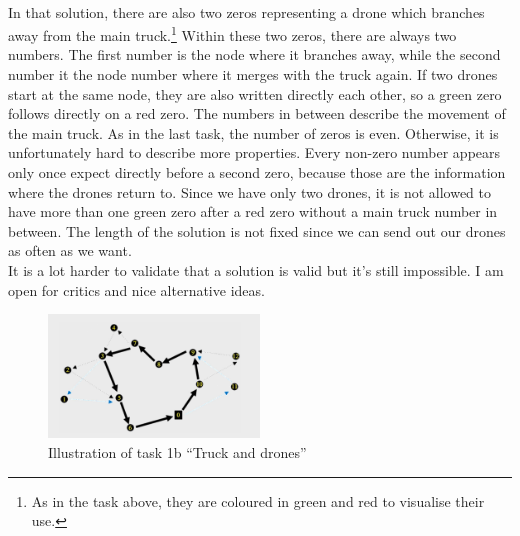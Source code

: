 \documentclass[a4paper,10pt]{article}
\theoremstyle{mytheor}
\begin{document}
\\
In that solution, there are also two zeros representing a drone which branches away from the main truck.\footnote{As in the task above, they are coloured in green and red to visualise their use.} Within these two zeros, there are always two numbers. The first number is the node where it branches away, while the second number it the node number where it merges with the truck again. If two drones start at the same node, they are also written directly each other, so a green zero follows directly on a red zero. The numbers in between describe the movement of the main truck. As in the last task, the number of zeros is even. Otherwise, it is unfortunately hard to describe more properties. Every non-zero number appears only once expect directly before a second zero, because those are the information where the drones return to. Since we have only two drones, it is not allowed to have more than one green zero after a red zero without a main truck number in between. The length of the solution is not fixed since we can send out our drones as often as we want.\\
It is a lot harder to validate that a solution is valid but it's still impossible. I am open for critics and nice alternative ideas.

\begin{figure}[h]
\centering
\includegraphics[width=0.5\textwidth]{task1b}
\caption{Illustration of task 1b \enquote{Truck and drones}}
\label{fig:task1b}
\end{figure}
\end{document}
